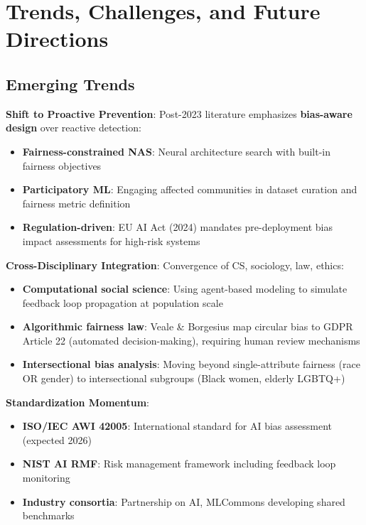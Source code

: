 \documentclass[11pt,a4paper]{article}
\begin{document}
\section{Trends, Challenges, and Future Directions}

\subsection{Emerging Trends}

\textbf{Shift to Proactive Prevention}:  
Post-2023 literature emphasizes \textbf{bias-aware design} over reactive detection:
\begin{itemize}
    \item \textbf{Fairness-constrained NAS}: Neural architecture search with built-in fairness objectives \cite{yang2025}
    \item \textbf{Participatory ML}: Engaging affected communities in dataset curation and fairness metric definition  
    \item \textbf{Regulation-driven}: EU AI Act (2024) mandates pre-deployment bias impact assessments for high-risk systems \cite{veale2024}
\end{itemize}

\textbf{Cross-Disciplinary Integration}:  
Convergence of CS, sociology, law, ethics:
\begin{itemize}
    \item \textbf{Computational social science}: Using agent-based modeling to simulate feedback loop propagation at population scale  
    \item \textbf{Algorithmic fairness law}: Veale \& Borgesius \cite{veale2024} map circular bias to GDPR Article 22 (automated decision-making), requiring human review mechanisms  
    \item \textbf{Intersectional bias analysis}: Moving beyond single-attribute fairness (race OR gender) to intersectional subgroups (Black women, elderly LGBTQ+)
\end{itemize}

\textbf{Standardization Momentum}:  
\begin{itemize}
    \item \textbf{ISO/IEC AWI 42005}: International standard for AI bias assessment (expected 2026)  
    \item \textbf{NIST AI RMF}: Risk management framework including feedback loop monitoring  
    \item \textbf{Industry consortia}: Partnership on AI, MLCommons developing shared benchmarks
\end{itemize}
\end{document}
